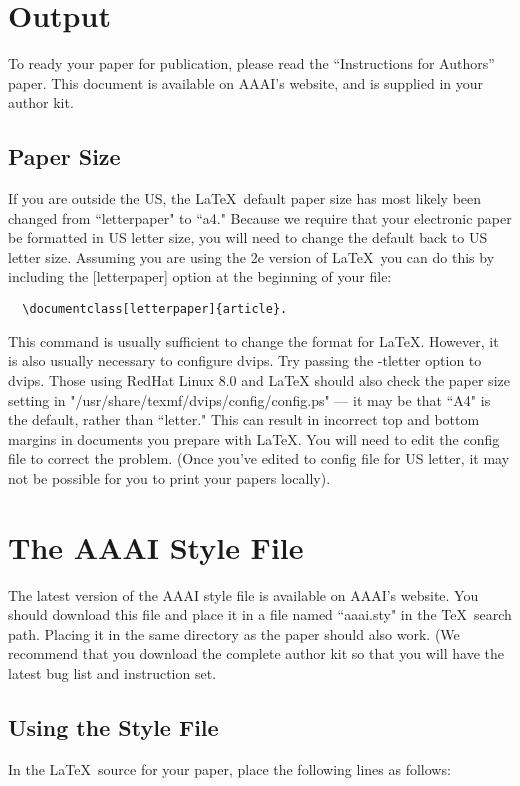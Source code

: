 \documentclass[letterpaper]{article}
\begin{document}
\section{Output}
To ready your paper for publication, please read the ``Instructions for Authors''
paper. This document is available on AAAI's website, and is supplied in your
author kit.

\subsection{Paper Size}
If you are outside the US, the \LaTeX\ default paper size has most likely been
changed from ``letterpaper" to ``a4." Because we require that your electronic
paper be formatted in US letter size, you will need to change the default back to
US letter size. Assuming you are using the 2e version of \LaTeX\, you can do this
by including the [letterpaper] option at the beginning of your file:
\begin{footnotesize}
\begin{verbatim}
  \documentclass[letterpaper]{article}. 
\end{verbatim}
\end{footnotesize}

This command is usually sufficient to change the format for LaTeX. However,  it
is also usually necessary to configure dvips. Try passing the -tletter option to
dvips. Those using RedHat Linux 8.0 and LaTeX should also check the paper size
setting in  "/usr/share/texmf/dvips/config/config.ps" --- it may be that ``A4" is
the default, rather than ``letter."  This  can result in incorrect top and bottom
margins in documents you prepare with LaTeX. You will need to edit the config
file to correct the problem. (Once you've edited to config file for US letter, it
may not be possible for you to print your papers locally).


\section{The AAAI Style File}
The latest version of the AAAI style file is available on AAAI's website. You
should download this file and place it in a file named ``aaai.sty" in the \TeX\
search path. Placing it in the same directory as the paper should also work. (We
recommend that you download the complete author kit so that you will have the
latest bug list and instruction set.

\subsection{Using the Style File}
In the \LaTeX\ source for your paper, place the following lines as follows:
\end{document}
